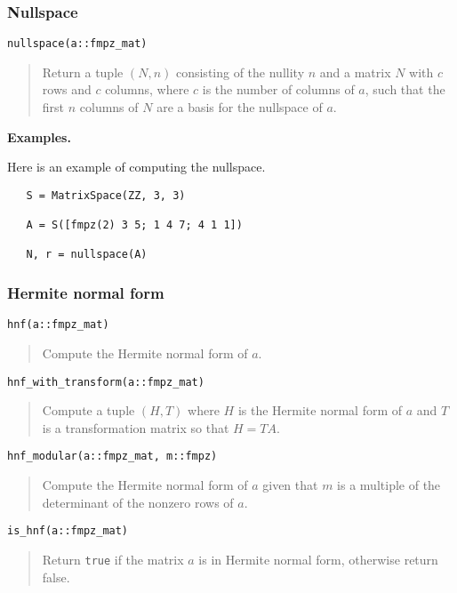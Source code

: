 \documentclass[a4paper,10pt]{article}
\newcommand{\code}{\lstinline}
\newcommand{\desc}[1]{\vspace{-3mm}\begin{quote}#1\end{quote}}
\begin{document}
{{\subsubsection{Nullspace}

\begin{lstlisting}
nullspace(a::fmpz_mat)
\end{lstlisting}

\desc{Return a tuple $(N, n)$ consisting of the nullity $n$ and a matrix $N$ with
$c$ rows and $c$ columns, where $c$ is the number of columns of $a$, such that 
the first $n$ columns of $N$ are a basis for the nullspace of $a$.}

\textbf{Examples.}

Here is an example of computing the nullspace.

\begin{lstlisting}
   S = MatrixSpace(ZZ, 3, 3)

   A = S([fmpz(2) 3 5; 1 4 7; 4 1 1])
   
   N, r = nullspace(A)
\end{lstlisting}

\subsubsection{Hermite normal form}

\begin{lstlisting}
hnf(a::fmpz_mat)
\end{lstlisting}

\desc{Compute the Hermite normal form of $a$.}

\begin{lstlisting}
hnf_with_transform(a::fmpz_mat)
\end{lstlisting}

\desc{Compute a tuple $(H, T)$ where $H$ is the Hermite normal form of $a$
and $T$ is a transformation matrix so that $H = TA$.}

\begin{lstlisting}
hnf_modular(a::fmpz_mat, m::fmpz)
\end{lstlisting}

\desc{Compute the Hermite normal form of $a$ given that $m$ is a multiple of
the determinant of the nonzero rows of $a$.}

\begin{lstlisting}
is_hnf(a::fmpz_mat)
\end{lstlisting}

\desc{Return \code{true} if the matrix $a$ is in Hermite normal form, otherwise
return false.}

}}
\end{document}
